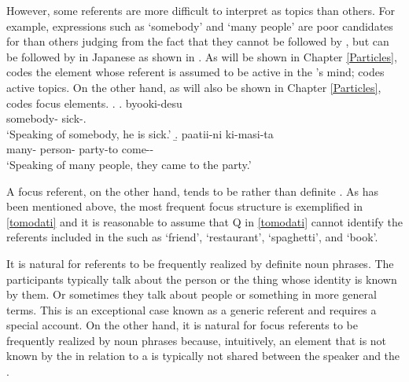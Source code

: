 However,
some  referents are more difficult to interpret as topics than others.
For example, expressions such as  `somebody' and  `many people' are poor candidates for  than others
judging from the fact that they cannot be followed by , but can be followed by  in Japanese as shown in \Next \cite[][p.\ 37 ff.]{kuno73}.
As will be shown in Chapter \ref{Particles},
 codes the element whose referent is assumed to be active in the 's mind;
 codes active topics.
On the other hand, as will also be shown in Chapter \ref{Particles},
 codes focus elements.
\ex. \a.  byooki-desu \\
		somebody- sick-. \\
		`Speaking of somebody, he is sick.'
	\b.   paatii-ni ki-masi-ta \\
		many- person- party-to come-- \\
		`Speaking of many people, they came to the party.'



A focus referent, on the other hand,
tends to be  rather than definite \cite{givon76,keenan76,comrie79,comrie83,dubois87}.
As has been mentioned above,
the most frequent focus structure is  exemplified in \ref{tomodati} and
it is reasonable to assume that Q in \ref{tomodati} cannot identify the referents included in the  such as `friend', `restaurant', `spaghetti', and `book'.

%

It is natural for  referents to be frequently realized by definite noun phrases.
The participants typically talk about the person or the thing whose identity is known by them.
Or sometimes they talk about people or something in more general terms.
This is an exceptional case known as a generic referent and requires a special account.
On the other hand, it is natural for focus referents to be frequently realized by  noun phrases
because, intuitively, an element that is not known by the  in relation to a  is typically not shared between the speaker and the .


